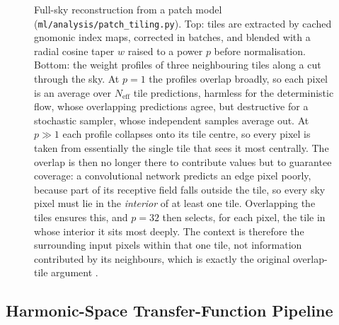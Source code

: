 \documentclass{report}
\begin{document}
\begin{figure}[h!]
{}
\caption{Full-sky reconstruction from a patch model (\texttt{ml/analysis/patch\_tiling.py}). Top: tiles are extracted by cached gnomonic index maps, corrected in batches, and blended with a radial cosine taper $w$ raised to a power $p$ before normalisation. Bottom: the weight profiles of three neighbouring tiles along a cut through the sky. At \mbox{$p=1$} the profiles overlap broadly, so each pixel is an average over \mbox{$N_{\mathrm{eff}}$} tile predictions, harmless for the deterministic flow, whose overlapping predictions agree, but destructive for a stochastic sampler, whose independent samples average out. At \mbox{$p\gg1$} each profile collapses onto its tile centre, so every pixel is taken from essentially the single tile that sees it most centrally. The overlap is then no longer there to contribute values but to guarantee coverage: a convolutional network predicts an edge pixel poorly, because part of its receptive field falls outside the tile, so every sky pixel must lie in the \emph{interior} of at least one tile. Overlapping the tiles ensures this, and \mbox{$p=32$} then selects, for each pixel, the tile in whose interior it sits most deeply. The context is therefore the surrounding input pixels within that one tile, not information contributed by its neighbours, which is exactly the original overlap-tile argument \cite{ronneberger_u-net_2015}.}
\label{fig:tiling}
\end{figure}

\clearpage
\subsection{Harmonic-Space Transfer-Function Pipeline}
\label{subsec:pipe-transfer}
\end{document}
